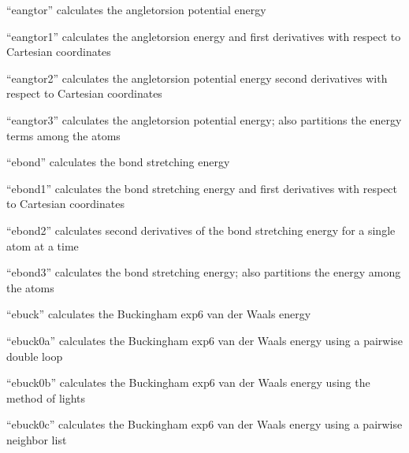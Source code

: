 \documentclass[letterpaper,11pt,english]{sphinxmanual}
\begin{document}
“eangtor” calculates the angle\sphinxhyphen{}torsion potential energy


“eangtor1” calculates the angle\sphinxhyphen{}torsion energy and first
derivatives with respect to Cartesian coordinates


“eangtor2” calculates the angle\sphinxhyphen{}torsion potential energy
second derivatives with respect to Cartesian coordinates


“eangtor3” calculates the angle\sphinxhyphen{}torsion potential energy;
also partitions the energy terms among the atoms


“ebond” calculates the bond stretching energy


“ebond1” calculates the bond stretching energy and
first derivatives with respect to Cartesian coordinates


“ebond2” calculates second derivatives of the bond
stretching energy for a single atom at a time


“ebond3” calculates the bond stretching energy; also
partitions the energy among the atoms


“ebuck” calculates the Buckingham exp\sphinxhyphen{}6 van der Waals energy


“ebuck0a” calculates the Buckingham exp\sphinxhyphen{}6 van der Waals energy
using a pairwise double loop


“ebuck0b” calculates the Buckingham exp\sphinxhyphen{}6 van der Waals energy
using the method of lights


“ebuck0c” calculates the Buckingham exp\sphinxhyphen{}6 van der Waals energy
using a pairwise neighbor list

\end{document}
